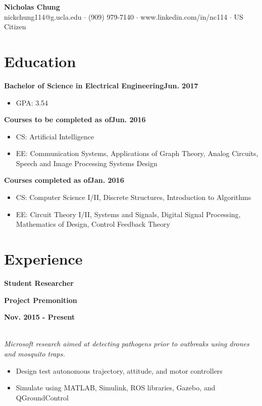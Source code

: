 \documentclass[12pt]{article}
\newcommand\textbox[1]{\parbox{.333\textwidth}{#1}}
\newcommand{\textlcr}[3]{\textbox{\textbf{#1}\hfill}\textbox{\hfil \textbf{#2}\hfil}\textbox{\hfill \textbf{#3}}}
\begin{document}
\begin{center}
	\textbf{\LARGE Nicholas Chung} \\ \vspace{.5ex}
	nickchung114@g.ucla.edu $\cdot$ (909) 979-7140 $\cdot$ www.linkedin.com/in/nc114 $\cdot$ US Citizen
\end{center}

\vspace{-8pt}
\smallskip
\section*{Education}
\vspace*{-1em}\makebox[\linewidth]{\rule{\textwidth}{0.4pt}}

\textbf{Bachelor of Science in Electrical Engineering}\hfill\textbf{Jun. 2017}
\begin{itemize}
\item GPA: 3.54
\end{itemize}

\textbf{Courses to be completed as of}\hfill\textbf{Jun. 2016}
\begin{itemize}
\item CS: Artificial Intelligence
\item EE: Communication Systems, Applications of Graph Theory, Analog Circuits, Speech and Image Processing Systems Design
\end{itemize}

\textbf{Courses completed as of}\hfill\textbf{Jan. 2016}
\begin{itemize}
\item CS: Computer Science I/II, Discrete Structures, Introduction to Algorithms
\item EE: Circuit Theory I/II, Systems and Signals, Digital Signal Processing, Mathematics of Design, Control Feedback Theory
\end{itemize}

\section*{Experience}
\vspace*{-1em}\makebox[\linewidth]{\rule{\textwidth}{0.4pt}}

\textlcr{Student Researcher}{Project Premonition}{Nov. 2015 - Present} \\
\textit{Microsoft research aimed at detecting pathogens prior to outbreaks using drones and mosquito traps.}
\begin{itemize}
\item Design test autonomous trajectory, attitude, and motor controllers 
\item Simulate using MATLAB, Simulink, ROS libraries, Gazebo, and QGroundControl
\end{itemize}
\end{document}
